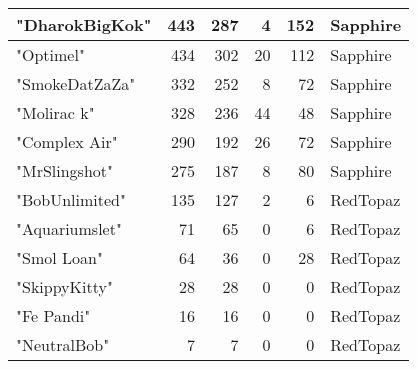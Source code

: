 \documentclass{article}
\begin{document}
\begin{table}[htbp]
\begin{tabular}{|l|r|r|r|r|l|}
"DharokBigKok" & 443 & 287 & 4 & 152 & Sapphire \\ \hline
"Optimel" & 434 & 302 & 20 & 112 & Sapphire \\ \hline
"SmokeDatZaZa" & 332 & 252 & 8 & 72 & Sapphire \\ \hline
"Molirac k" & 328 & 236 & 44 & 48 & Sapphire \\ \hline
"Complex Air" & 290 & 192 & 26 & 72 & Sapphire \\ \hline
"MrSlingshot" & 275 & 187 & 8 & 80 & Sapphire \\ \hline
"BobUnlimited" & 135 & 127 & 2 & 6 & RedTopaz \\ \hline
"Aquariumslet" & 71 & 65 & 0 & 6 & RedTopaz \\ \hline
"Smol Loan" & 64 & 36 & 0 & 28 & RedTopaz \\ \hline
"SkippyKitty" & 28 & 28 & 0 & 0 & RedTopaz \\ \hline
"Fe Pandi" & 16 & 16 & 0 & 0 & RedTopaz \\ \hline
"NeutralBob" & 7 & 7 & 0 & 0 & RedTopaz \\ \hline
\end{tabular}
\end{table}
\end{document}
